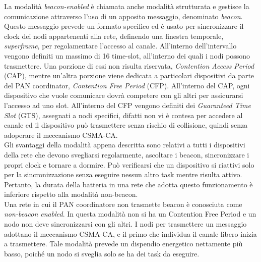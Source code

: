 \noindent La modalità \textit{beacon-enabled} è chiamata anche modalità strutturata e gestisce la comunicazione attraverso l'uso di un apposito messaggio, denominato \textit{beacon}. Questo messaggio prevede un formato specifico ed è usato per sincronizzare il clock dei nodi appartenenti alla rete, definendo una finestra temporale, \textit{superframe}, per regolamentare l'accesso al canale. All'interno dell'intervallo vengono definiti un massimo di 16 time-slot, all'interno dei quali i nodi possono trasmettere. 
Una porzione di essi non risulta riservata, \textit{Contention Access Period} (CAP), mentre un'altra porzione viene dedicata a particolari dispositivi da parte del PAN coordinator, \textit{Contention Free Period} (CFP).
All'interno del CAP, ogni dispositivo che vuole comunicare dovrà competere con gli altri per assicurarsi l'accesso ad uno slot. All'interno del CFP vengono definiti dei \textit{Guaranteed Time Slot} (GTS), assegnati a nodi specifici, difatti non vi è contesa per accedere al canale ed il dispositivo può trasmettere senza rischio di collisione, quindi senza adoperare il meccanismo CSMA-CA.\\
Gli svantaggi della modalità appena descritta sono relativi a tutti i dispositivi della rete che devono svegliarsi regolarmente, ascoltare i beacon, sincronizzare i propri clock e tornare a dormire. Può verificarsi che un dispositivo si riattivi solo per la sincronizzazione senza eseguire nessun altro task mentre risulta attivo. Pertanto, la durata della batteria in una rete che adotta questo funzionamento è inferiore rispetto alla modalità non-beacon.\\

\noindent Una rete in cui il PAN coordinatore non trasmette beacon è conosciuta come \textit{non-beacon enabled}. In questa modalità non si ha un Contention Free Period e un nodo non deve sincronizzarsi con gli altri. I nodi per trasmettere un messaggio adottano il meccanismo CSMA-CA, e il primo che individua il canale libero inizia a trasmettere. Tale modalità prevede un dispendio energetico nettamente più basso, poiché un nodo si sveglia solo se ha dei task da eseguire.

